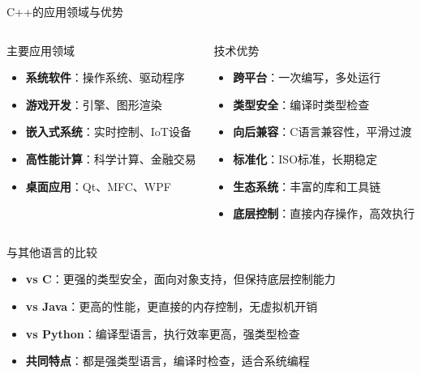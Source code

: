 \documentclass[UTF8,aspectratio=169]{beamer}
\begin{document}
\begin{frame}{C++的应用领域与优势}
    \begin{columns}
        \begin{column}{0.48\textwidth}
            \begin{ytublock}{主要应用领域}
                \begin{itemize}
                    \item \textbf{系统软件}：操作系统、驱动程序
                    \item \textbf{游戏开发}：引擎、图形渲染
                    \item \textbf{嵌入式系统}：实时控制、IoT设备
                    \item \textbf{高性能计算}：科学计算、金融交易
                    \item \textbf{桌面应用}：Qt、MFC、WPF
                \end{itemize}
            \end{ytublock}
        \end{column}
        \begin{column}{0.48\textwidth}
                \begin{ytublock}{技术优势}
        \begin{itemize}
            \item \textbf{跨平台}：一次编写，多处运行
            \item \textbf{类型安全}：编译时类型检查
            \item \textbf{向后兼容}：C语言兼容性，平滑过渡
            \item \textbf{标准化}：ISO标准，长期稳定
            \item \textbf{生态系统}：丰富的库和工具链
            \item \textbf{底层控制}：直接内存操作，高效执行
        \end{itemize}
    \end{ytublock}
        \end{column}
    \end{columns}

    \begin{ytublock}{与其他语言的比较}
        \begin{itemize}
            \item \textbf{vs C}：更强的类型安全，面向对象支持，但保持底层控制能力
            \item \textbf{vs Java}：更高的性能，更直接的内存控制，无虚拟机开销
            \item \textbf{vs Python}：编译型语言，执行效率更高，强类型检查
            \item \textbf{共同特点}：都是强类型语言，编译时检查，适合系统编程
        \end{itemize}
    \end{ytublock}
\end{frame}
\end{document}
